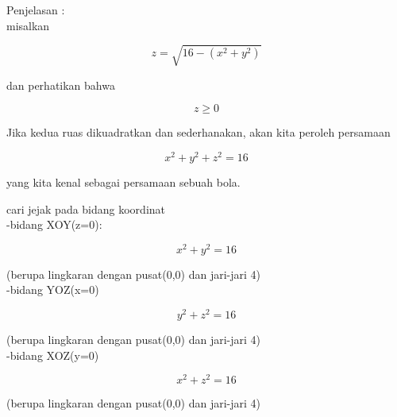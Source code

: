 \documentclass[12pt,arial,letterpaper]{book}
\begin{document}
\begin{eulercomment}
\begin{eulercomment}
\begin{eulercomment}
\begin{eulercomment}
\begin{eulercomment}
\begin{eulercomment}
\begin{eulercomment}
\begin{eulercomment}
\begin{eulercomment}
\begin{eulercomment}
\begin{eulercomment}
\begin{eulercomment}
\begin{eulercomment}
\begin{eulercomment}
\begin{eulercomment}
\begin{eulercomment}
\begin{eulercomment}
\begin{eulercomment}
\begin{eulercomment}
Penjelasan :\\
misalkan\\
\end{eulercomment}
\begin{eulerformula}
\[
z=\sqrt{16-(x^2+y^2)}
\]
\end{eulerformula}
\begin{eulercomment}
dan perhatikan bahwa\\
\end{eulercomment}
\begin{eulerformula}
\[
z\ge 0
\]
\end{eulerformula}
\begin{eulercomment}
Jika kedua ruas dikuadratkan dan sederhanakan, akan kita peroleh
persamaan\\
\end{eulercomment}
\begin{eulerformula}
\[
x^2+y^2+z^2=16
\]
\end{eulerformula}
\begin{eulercomment}
yang kita kenal sebagai persamaan sebuah bola.

cari jejak pada bidang koordinat\\
-bidang XOY(z=0):\\
\end{eulercomment}
\begin{eulerformula}
\[
x^2+y^2=16
\]
\end{eulerformula}
\begin{eulercomment}
(berupa lingkaran dengan pusat(0,0) dan jari-jari 4)\\
-bidang YOZ(x=0)\\
\end{eulercomment}
\begin{eulerformula}
\[
y^2+z^2=16
\]
\end{eulerformula}
\begin{eulercomment}
(berupa lingkaran dengan pusat(0,0) dan jari-jari 4)\\
-bidang XOZ(y=0)\\
\end{eulercomment}
\begin{eulerformula}
\[
x^2+z^2=16
\]
\end{eulerformula}
\begin{eulercomment}
(berupa lingkaran dengan pusat(0,0) dan jari-jari 4)


\end{eulercomment}
\end{eulercomment}
\end{eulercomment}
\end{eulercomment}
\end{eulercomment}
\end{eulercomment}
\end{eulercomment}
\end{eulercomment}
\end{eulercomment}
\end{eulercomment}
\end{eulercomment}
\end{eulercomment}
\end{eulercomment}
\end{eulercomment}
\end{eulercomment}
\end{eulercomment}
\end{eulercomment}
\end{eulercomment}
\end{eulercomment}
\end{document}
